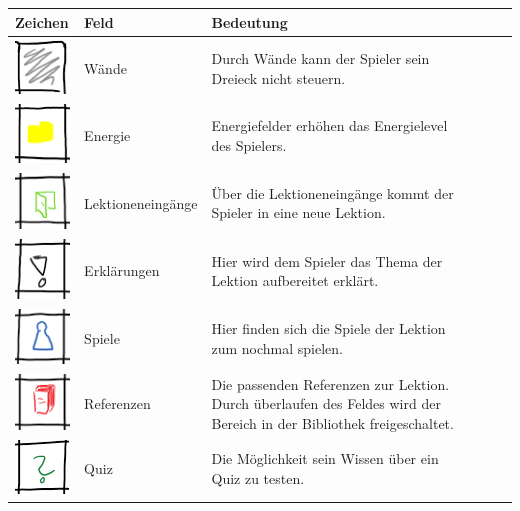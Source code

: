 \begin{center}
\label{tbl_mapFields}
\begin{tabular}{ |p{2cm} |p{3.1cm} | p{7.9cm}| c r r }
\hline
Zeichen & Feld & Bedeutung \\
\hline
\includegraphics[scale=1.1]{bilder/Wand.png} & Wände & Durch Wände kann der Spieler sein Dreieck nicht steuern. \\  
\hline
\includegraphics[scale=1.1]{bilder/Energie.png} & Energie & Energiefelder erhöhen das Energielevel des Spielers. \\
\hline
\includegraphics[scale=1.1]{bilder/Lektioneneingang.png} & Lektioneneingänge & Über die Lektioneneingänge kommt der Spieler in eine neue Lektion. \\ 
\hline
\includegraphics[scale=1.1]{bilder/Erklaerungen.png} & Erklärungen & Hier wird dem Spieler das Thema der Lektion aufbereitet erklärt. \\
\hline
\includegraphics[scale=1.1]{bilder/Spiele.png} & Spiele & Hier finden sich die Spiele der Lektion zum nochmal spielen. \\
\hline
\includegraphics[scale=1.1]{bilder/referenzen.png} & Referenzen & Die passenden Referenzen zur Lektion. Durch überlaufen des Feldes wird der Bereich in der Bibliothek freigeschaltet. \\
\hline
\includegraphics[scale=1.1]{bilder/Quiz.png} & Quiz & Die Möglichkeit sein Wissen über ein Quiz zu testen.\\
\hline
\end{tabular}
\end{center}


